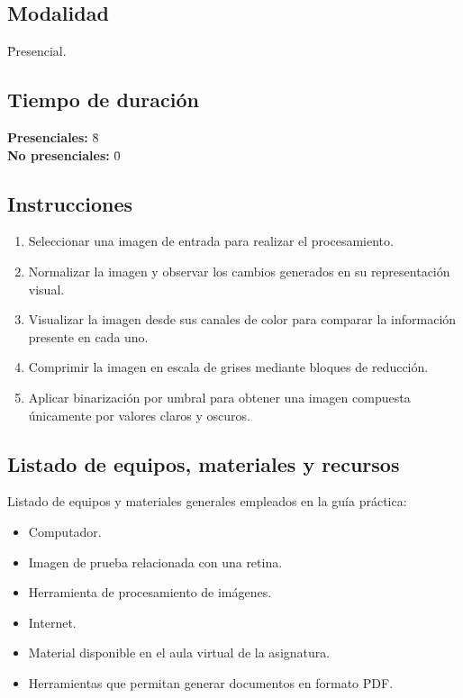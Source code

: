 \documentclass[11pt]{article}
\begin{document}
\subsection{Modalidad}
\begin{tabbing}
    \hspace{1cm} \= Presencial.
\end{tabbing}

\subsection{Tiempo de duración}
\begin{tabbing}
    \hspace{1cm} \= \textbf{Presenciales:} \= 8 \\
    \hspace{1cm} \= \textbf{No presenciales:} \= 0
\end{tabbing}

\subsection{Instrucciones}
\begin{enumerate}
    \item Seleccionar una imagen de entrada para realizar el procesamiento.
    \item Normalizar la imagen y observar los cambios generados en su representación visual.
    \item Visualizar la imagen desde sus canales de color para comparar la información presente en cada uno.
    \item Comprimir la imagen en escala de grises mediante bloques de reducción.
    \item Aplicar binarización por umbral para obtener una imagen compuesta únicamente por valores claros y oscuros.
\end{enumerate}

\subsection{Listado de equipos, materiales y recursos}
Listado de equipos y materiales generales empleados en la guía práctica:
\begin{itemize}
    \item Computador.
    \item Imagen de prueba relacionada con una retina.
    \item Herramienta de procesamiento de imágenes.
    \item Internet.
    \item Material disponible en el aula virtual de la asignatura.
    \item Herramientas que permitan generar documentos en formato PDF.
\end{itemize}
\end{document}
